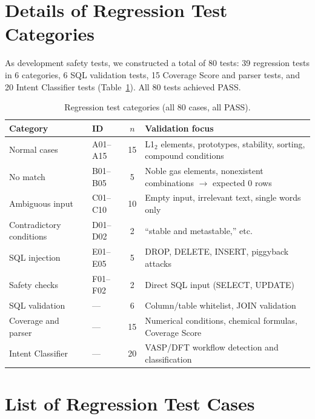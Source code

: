 \documentclass[5p,twocolumn]{elsarticle}
\begin{document}
\section{Details of Regression Test Categories}
\label{sec:sup_test_categories}

As development safety tests, we constructed a total of 80 tests:
39 regression tests in 6 categories,
6 SQL validation tests, 15 Coverage Score and parser tests,
and 20 Intent Classifier tests (Table~\ref{tab:sup_test_categories}).
All 80 tests achieved PASS.

\begin{table}[htbp]
\centering
\caption{Regression test categories (all 80 cases, all PASS).}
\label{tab:sup_test_categories}
\small
\begin{tabularx}{\textwidth}{llcX}
  \toprule
  Category & ID & $n$ & Validation focus \\
  \midrule
  Normal cases & A01--A15 & 15 & L1$_2$ elements, prototypes, stability, sorting, compound conditions \\
  No match & B01--B05 & 5 & Noble gas elements, nonexistent combinations $\to$ expected 0 rows \\
  Ambiguous input & C01--C10 & 10 & Empty input, irrelevant text, single words only \\
  Contradictory conditions & D01--D02 & 2 & ``stable and metastable,'' etc. \\
  SQL injection & E01--E05 & 5 & DROP, DELETE, INSERT, piggyback attacks \\
  Safety checks & F01--F02 & 2 & Direct SQL input (SELECT, UPDATE) \\
  SQL validation & --- & 6 & Column/table whitelist, JOIN validation \\
  Coverage and parser & --- & 15 & Numerical conditions, chemical formulas, Coverage Score \\
  Intent Classifier & --- & 20 & VASP/DFT workflow detection and classification \\
  \bottomrule
\end{tabularx}
\end{table}

\section{List of Regression Test Cases}
\label{sec:sup_all_tests}
\end{document}
